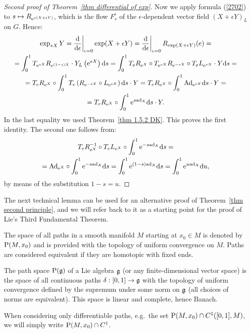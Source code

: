 \begin{proof}[Second proof of Theorem~\ref{thm differential of exp}]
    Now we apply formula (\ref{2702}) to $s\mapsto R_{\mathrm{e}^{s(X+\epsilon Y)}}$, which is the flow $F^\epsilon_s$ of the $\epsilon$-dependent vector field $(X+\epsilon Y)_L$ on $G$. Hence:
    \begin{multline}
        \exp_{\ast X}Y=\restr{\frac{\dd}{\dd \epsilon}}{\epsilon=0}\exp(X+\epsilon Y)=\restr{\frac{\dd}{\dd \epsilon}}{\epsilon=0}R_{\exp(X+\epsilon Y)}(e)=\\
        =\int_0^1T_{\rme^{sX}}R_{\rme^{(1-s)X}}\cdot Y_L\left(\rme^{sX}\right)\dd s=
        \int_0^1 T_e R_{\rme^X}\circ T_{\rme^{sX}}R_{\rme^{-sX}}\circ T_e L_{\rme^{sX}}\cdot Y \dd s=\\
        =T_e R_{\rme^X}\circ\int_0^1 T_e\left(R_{\rme^{-sX}}\circ L_{\rme^{sX}}\right)\dd s \cdot Y=
        T_e R_{\rme^X}\circ \int_0^1 \Ad_{\rme^{sX}}\dd s\cdot Y=\\
        =T_eR_{\rme^X}\circ \int_0^1 \rme^{s\ad_X}\dd s\cdot Y.
    \end{multline}
    In the last equality we used Theorem~\ref{thm 1.5.2 DK}. This proves the first identity. The second one follows from:
    \begin{multline}
        T_e R_{\mathrm{e}^X}^{-1}\circ T_eL_{\mathrm{e}^X}\circ \int_0^1 \mathrm{e}^{-s\mathrm{ad}_X}{\mathrm{d}} s=\\
        =\mathrm{Ad}_{\mathrm{e}^X}\circ\int_0^1 \mathrm{e}^{-s\mathrm{ad}_X}{\mathrm{d}} s=\int_0^1 \mathrm{e}^{(1-s)\mathrm{ad}_X}{\mathrm{d}} s=\int_0^1 \mathrm{e}^{u\mathrm{ad}_X}{\mathrm{d}} u,
    \end{multline}
    by means of the substitution $1-s=u$.
\end{proof}

The next technical lemma can be used for an alternative proof of Theorem~\ref{thm second principle}, and we will refer back to it as a starting point for the proof of Lie's Third Fundamental Theorem.

\begin{defn}
    The space of all paths in a smooth manifold $M$ starting at $x_0\in M$ is denoted by $\mathrm{P}(M,x_0)$ and is provided with the topology of uniform convergence on $M$. Paths are considered equivalent if they are homotopic with fixed ends.

    The path space $\mathrm{P}(\mathfrak{g})$ of a Lie algebra $\mathfrak{g}$ (or any finite-dimensional vector space) is the space of all continuous paths $\delta:[0,1]\to \mathfrak{g}$ with the topology of uniform convergence defined by the supremum under some norm on $\mathfrak{g}$ (all choices of norms are equivalent). This space is linear and complete, hence Banach.

    When considering only differentiable paths, e.g.~the set $\mathrm{P}(M,x_0)\cap C^1([0,1],M)$, we will simply write $\mathrm{P}(M,x_0)\cap C^1$. 
\end{defn}

